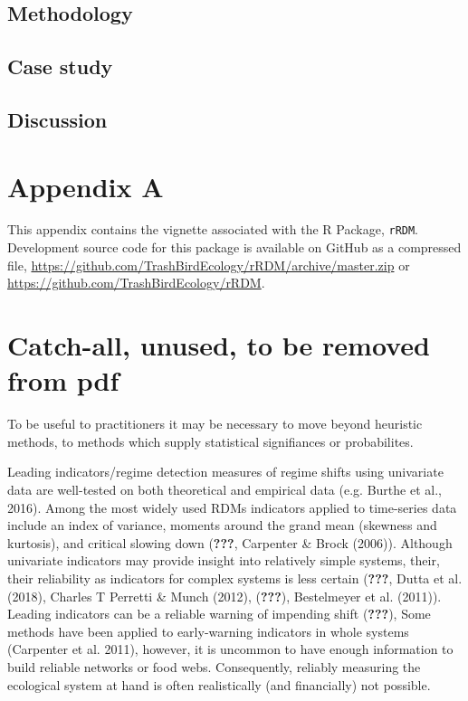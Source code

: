 \documentclass[12pt,twoside,openany]{reedthesis}
\begin{document}
\section{Methodology}\label{methodology}

\section{Case study}\label{case-study-1}

\section{Discussion}\label{discussion-2}

\appendix

\chapter*{Appendix A}\label{rRDM}

This appendix contains the vignette associated with the R Package,
\texttt{rRDM}. Development source code for this package is available on
GitHub as a compressed file,
\url{https://github.com/TrashBirdEcology/rRDM/archive/master.zip} or
\url{https://github.com/TrashBirdEcology/rRDM}.

\chapter*{Catch-all, unused, to be removed from
pdf}\label{catch-all-unused-to-be-removed-from-pdf}

To be useful to practitioners it may be necessary to move beyond
heuristic methods, to methods which supply statistical signifiances or
probabilites.

Leading indicators/regime detection measures of regime shifts using
univariate data are well-tested on both theoretical and empirical data
(e.g. Burthe et al., 2016). Among the most widely used RDMs indicators
applied to time-series data include an index of variance, moments around
the grand mean (skewness and kurtosis), and critical slowing down
({\textbf{???}}, Carpenter \& Brock (2006)). Although univariate
indicators may provide insight into relatively simple systems, their,
their reliability as indicators for complex systems is less certain
({\textbf{???}}, Dutta et al. (2018), Charles T Perretti \& Munch
(2012), ({\textbf{???}}), Bestelmeyer et al. (2011)). Leading indicators
can be a reliable warning of impending shift ({\textbf{???}}), Some
methods have been applied to early-warning indicators in whole systems
(Carpenter et al. 2011), however, it is uncommon to have enough
information to build reliable networks or food webs. Consequently,
reliably measuring the ecological system at hand is often realistically
(and financially) not possible.
\end{document}
